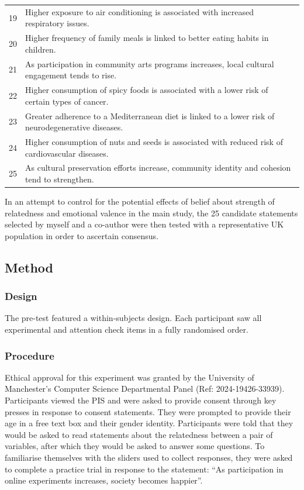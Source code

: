 \documentclass[../main.tex]{subfiles}
\begin{document}
\begin{table}
{\begin{tabular}[t]{rl}
19 & Higher exposure to air conditioning is associated with increased respiratory issues.\\
20 & Higher frequency of family meals is linked to better eating habits in children.\\
21 & As participation in community arts programs increases, local cultural engagement tends to rise.\\
22 & Higher consumption of spicy foods is associated with a lower risk of certain types of cancer.\\
23 & Greater adherence to a Mediterranean diet is linked to a lower risk of neurodegenerative diseases.\\
24 & Higher consumption of nuts and seeds is associated with reduced risk of cardiovascular diseases.\\
25 & As cultural preservation efforts increase, community identity and cohesion tend to strengthen.\\
\bottomrule
\end{tabular}

}

\end{table}%

In an attempt to control for the potential effects of belief about
strength of relatedness and emotional valence in the main study, the 25
candidate statements selected by myself and a co-author were then tested
with a representative UK population in order to ascertain consensus.

\subsection{Method}\label{method-e5a}

\subsubsection{Design}\label{design-e5a}

The pre-test featured a within-subjects design. Each participant saw all
experimental and attention check items in a fully randomised order.

\subsubsection{Procedure}\label{procedure-e5a}

Ethical approval for this experiment was granted by the University of
Manchester's Computer Science Departmental Panel (Ref:
2024-19426-33939). Participants viewed the PIS and were asked to provide
consent through key presses in response to consent statements. They were
prompted to provide their age in a free text box and their gender
identity. Participants were told that they would be asked to read
statements about the relatedness between a pair of variables, after
which they would be asked to answer some questions. To familiarise
themselves with the sliders used to collect responses, they were asked
to complete a practice trial in response to the statement: ``As
participation in online experiments increases, society becomes
happier''.
\end{document}
